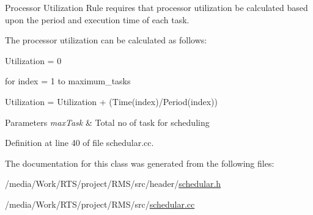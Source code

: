 Processor Utilization Rule requires that processor utilization be calculated based upon the period and execution time of each task. 

\begin{DoxyVerb}    The processor utilization can be calculated as follows:

    Utilization = 0

    for index = 1 to maximum_tasks

    Utilization = Utilization + (Time(index)/Period(index))
\end{DoxyVerb}



\begin{DoxyParams}{Parameters}
{\em max\-Task} & Total no of task for scheduling \\
\hline
\end{DoxyParams}


Definition at line 40 of file schedular.\-cc.



The documentation for this class was generated from the following files\-:\begin{DoxyCompactItemize}
\item 
/media/\-Work/\-R\-T\-S/project/\-R\-M\-S/src/header/\hyperlink{schedular_8h}{schedular.\-h}\item 
/media/\-Work/\-R\-T\-S/project/\-R\-M\-S/src/\hyperlink{schedular_8cc}{schedular.\-cc}\end{DoxyCompactItemize}
